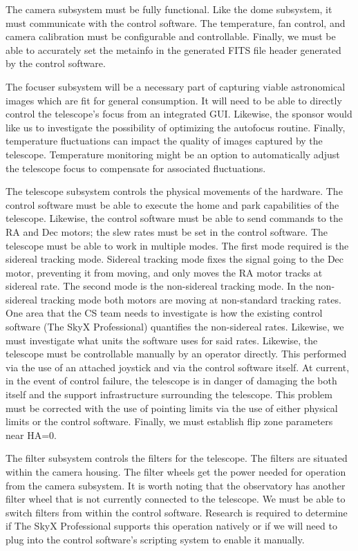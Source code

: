 \documentclass[12pt]{report}
\begin{document}
The camera subsystem must be fully functional. Like the dome subsystem, it must communicate with the control software. The temperature, fan control, and camera calibration must be configurable and controllable. Finally, we must be able to accurately set the metainfo in the generated FITS file header generated by the control software.

The focuser subsystem will be a necessary part of capturing viable astronomical images which are fit for general consumption. It will need to be able to directly control the telescope’s focus from an integrated GUI. Likewise, the sponsor would like us to investigate the possibility of optimizing the autofocus routine. Finally, temperature fluctuations can impact the quality of images captured by the telescope. Temperature monitoring might be an option to automatically adjust the telescope focus to compensate for associated fluctuations.

The telescope subsystem controls the physical movements of the hardware. The control software must be able to execute the home and park capabilities of the telescope. Likewise, the control software must be able to send commands to the RA and Dec motors; the slew rates must be set in the control software. The telescope must be able to work in multiple modes. The first mode required is the sidereal tracking mode. Sidereal tracking mode fixes the signal going to the Dec motor, preventing it from moving, and only moves the RA motor tracks at sidereal rate. The second mode is the non-sidereal tracking mode. In the non-sidereal tracking mode both motors are moving at non-standard tracking rates. One area that the CS team needs to investigate is how the existing control software (The SkyX Professional) quantifies the non-sidereal rates. Likewise, we must investigate what units the software uses for said rates. Likewise, the telescope must be controllable manually by an operator directly. This performed via the use of an attached joystick and via the control software itself. At current, in the event of control failure, the telescope is in danger of damaging the both itself and the support infrastructure surrounding the telescope. This problem must be corrected with the use of pointing limits via the use of either physical limits or the control software. Finally, we must establish flip zone parameters near HA=0.

The filter subsystem controls the filters for the telescope. The filters are situated within the camera housing. The filter wheels get the power needed for operation from the camera subsystem. It is worth noting that the observatory has another filter wheel that is not currently connected to the telescope. We must be able to switch filters from within the control software. Research is required to determine if The SkyX Professional supports this operation natively or if we will need to plug into the control software’s scripting system to enable it manually.
\end{document}
